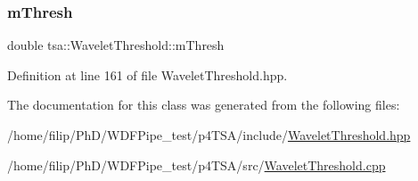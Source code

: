 \subsubsection{\texorpdfstring{m\+Thresh}{mThresh}}
{\footnotesize\ttfamily double tsa\+::\+Wavelet\+Threshold\+::m\+Thresh\hspace{0.3cm}{\ttfamily [private]}}



Definition at line 161 of file Wavelet\+Threshold.\+hpp.



The documentation for this class was generated from the following files\+:\begin{DoxyCompactItemize}
\item 
/home/filip/\+Ph\+D/\+W\+D\+F\+Pipe\+\_\+test/p4\+T\+S\+A/include/\hyperlink{_wavelet_threshold_8hpp}{Wavelet\+Threshold.\+hpp}\item 
/home/filip/\+Ph\+D/\+W\+D\+F\+Pipe\+\_\+test/p4\+T\+S\+A/src/\hyperlink{_wavelet_threshold_8cpp}{Wavelet\+Threshold.\+cpp}\end{DoxyCompactItemize}
